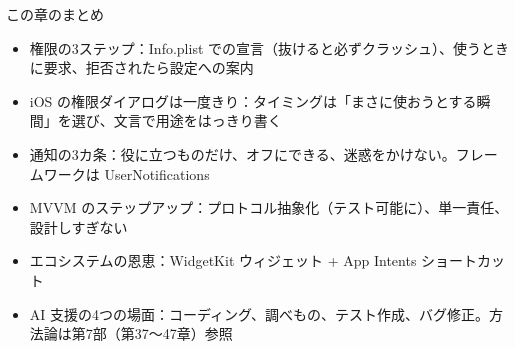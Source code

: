 \begin{tcbsummary}{この章のまとめ}
\begin{itemize}
  \item 権限の3ステップ：Info.plist での宣言（抜けると必ずクラッシュ）、使うときに要求、拒否されたら設定への案内
  \item iOS の権限ダイアログは一度きり：タイミングは「まさに使おうとする瞬間」を選び、文言で用途をはっきり書く
  \item 通知の3カ条：役に立つものだけ、オフにできる、迷惑をかけない。フレームワークは UserNotifications
  \item MVVM のステップアップ：プロトコル抽象化（テスト可能に）、単一責任、設計しすぎない
  \item エコシステムの恩恵：WidgetKit ウィジェット + App Intents ショートカット
  \item AI 支援の4つの場面：コーディング、調べもの、テスト作成、バグ修正。方法論は第7部（第37〜47章）参照
\end{itemize}

\end{tcbsummary}
